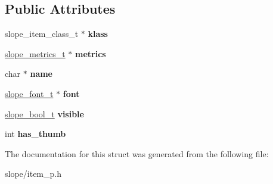 \subsection*{Public Attributes}
\begin{DoxyCompactItemize}
\item 
\hypertarget{struct__slope__item_add7193a54a1fabdb37cd26d048987395}{slope\+\_\+item\+\_\+class\+\_\+t $\ast$ {\bfseries klass}}\label{struct__slope__item_add7193a54a1fabdb37cd26d048987395}

\item 
\hypertarget{struct__slope__item_ac7bdb1cdc4aaf1fd8ae234eebc1e8e13}{\hyperlink{group__Metrics_gab80787ee8ae8dc449e770249fe0e3c35}{slope\+\_\+metrics\+\_\+t} $\ast$ {\bfseries metrics}}\label{struct__slope__item_ac7bdb1cdc4aaf1fd8ae234eebc1e8e13}

\item 
\hypertarget{struct__slope__item_a3a154a02eef112186595310fd7270769}{char $\ast$ {\bfseries name}}\label{struct__slope__item_a3a154a02eef112186595310fd7270769}

\item 
\hypertarget{struct__slope__item_a45d356cbfeac87fc96492f8392949376}{\hyperlink{group__Primitives_ga29945f78eef5fcab497a3d15908b4b73}{slope\+\_\+font\+\_\+t} $\ast$ {\bfseries font}}\label{struct__slope__item_a45d356cbfeac87fc96492f8392949376}

\item 
\hypertarget{struct__slope__item_aa937969eaa4af7e5be86b02f7d7ee377}{\hyperlink{group__Primitives_gac55afa016ca777119a6c343d1655d558}{slope\+\_\+bool\+\_\+t} {\bfseries visible}}\label{struct__slope__item_aa937969eaa4af7e5be86b02f7d7ee377}

\item 
\hypertarget{struct__slope__item_a3b8509ebb99801b1140a279aa79c629f}{int {\bfseries has\+\_\+thumb}}\label{struct__slope__item_a3b8509ebb99801b1140a279aa79c629f}

\end{DoxyCompactItemize}


The documentation for this struct was generated from the following file\+:\begin{DoxyCompactItemize}
\item 
slope/item\+\_\+p.\+h\end{DoxyCompactItemize}
